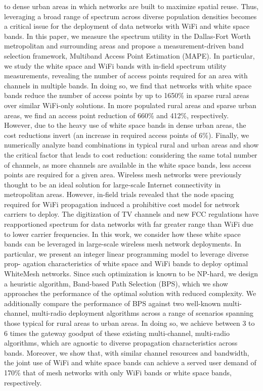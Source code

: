 to dense urban areas in which networks are built to maximize spatial reuse.  Thus, leveraging a broad 
range of spectrum across diverse population densities becomes a critical issue for the deployment of data
networks with WiFi and white space bands. In this paper, we measure the spectrum utility in the Dallas-Fort 
Worth metropolitan and surrounding
areas and propose a measurement-driven band selection framework, Multiband Access Point Estimation (MAPE). 
In particular, we study the white space and WiFi bands with in-field spectrum utility measurements, revealing 
the number of access points required for an area with channels in multiple bands. In doing so, we find that 
networks with white space bands reduce the number of access points by up to 1650\% in sparse
rural areas over similar WiFi-only solutions. In more populated rural areas and sparse urban areas, we 
find an access point reduction of 660\% and 412\%, respectively.  However, due to the heavy use of white
space bands in dense urban areas, the cost reductions invert (an increase in required access points 
of 6\%).  Finally, we numerically analyze band combinations in typical rural and urban areas and show 
the critical factor that leads to cost reduction: considering the same total number of channels, as more 
channels are available in the white space bands, less access points are required for a given area.
Wireless mesh networks were previously thought
to be an ideal solution for large-scale Internet connectivity in
metropolitan areas. However, in-field trials revealed that the node
spacing required for WiFi propagation induced a prohibitive
cost model for network carriers to deploy. The digitization
of TV channels and new FCC regulations have reapportioned
spectrum for data networks with far greater range than WiFi
due to lower carrier frequencies. In this work, we consider
how these white space bands can be leveraged in large-scale
wireless mesh network deployments. In particular, we present
an integer linear programming model to leverage diverse prop-
agation characteristics of white space and WiFi bands to deploy
optimal WhiteMesh networks. Since such optimization is known
to be NP-hard, we design a heuristic algorithm, Band-based Path
Selection (BPS), which we show approaches the performance of
the optimal solution with reduced complexity. We additionally
compare the performance of BPS against two well-known multi-
channel, multi-radio deployment algorithms across a range of
scenarios spanning those typical for rural areas to urban areas.
In doing so, we achieve between 3 to 6 times the gateway goodput
of these existing multi-channel, multi-radio algorithms, which
are agnostic to diverse propagation characteristics across bands.
Moreover, we show that, with similar channel resources and
bandwidth, the joint use of WiFi and white space bands can
achieve a served user demand of 170\% that of mesh networks
with only WiFi bands or white space bands, respectively.



